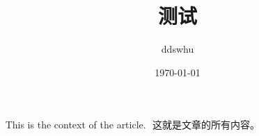 \documentclass[UTF8]{ctexart}
\title{测试}
\author{ddswhu}
\date{\today}
\begin{document}
\maketitle
​
This is the context of the article.
​
这就是文章的所有内容。
​
\end{document}
